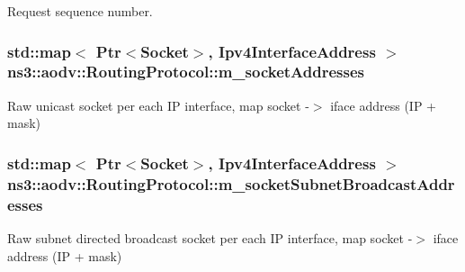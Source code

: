 Request sequence number. 

\subsubsection[{\texorpdfstring{m\+\_\+socket\+Addresses}{m_socketAddresses}}]{\setlength{\rightskip}{0pt plus 5cm}std\+::map$<$ {\bf Ptr}$<${\bf Socket}$>$, {\bf Ipv4\+Interface\+Address} $>$ ns3\+::aodv\+::\+Routing\+Protocol\+::m\+\_\+socket\+Addresses\hspace{0.3cm}{\ttfamily [private]}}\hypertarget{classns3_1_1aodv_1_1RoutingProtocol_aa3263563cbbd735faafbf17fd4e28a10}{}\label{classns3_1_1aodv_1_1RoutingProtocol_aa3263563cbbd735faafbf17fd4e28a10}


Raw unicast socket per each IP interface, map socket -\/$>$ iface address (IP + mask) 

\subsubsection[{\texorpdfstring{m\+\_\+socket\+Subnet\+Broadcast\+Addresses}{m_socketSubnetBroadcastAddresses}}]{\setlength{\rightskip}{0pt plus 5cm}std\+::map$<$ {\bf Ptr}$<${\bf Socket}$>$, {\bf Ipv4\+Interface\+Address} $>$ ns3\+::aodv\+::\+Routing\+Protocol\+::m\+\_\+socket\+Subnet\+Broadcast\+Addresses\hspace{0.3cm}{\ttfamily [private]}}\hypertarget{classns3_1_1aodv_1_1RoutingProtocol_a3516a9ee6cc1a0ebde0fdc08680dc7c4}{}\label{classns3_1_1aodv_1_1RoutingProtocol_a3516a9ee6cc1a0ebde0fdc08680dc7c4}


Raw subnet directed broadcast socket per each IP interface, map socket -\/$>$ iface address (IP + mask) 


